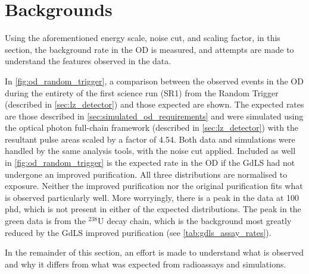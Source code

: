 \section{Backgrounds}
\label{sec:od_analysis_backgrounds}
\par
Using the aforementioned energy scale, noise cut, and scaling factor, in this section, the background rate in the OD is measured, and attempts are made to understand the features observed in the data.
\par
In \autoref{fig:od_random_trigger}, a comparison between the observed events in the OD during the entirety of the first science run (SR1) from the Random Trigger (described in \autoref{sec:lz_detector}) and those expected are shown.
The expected rates are those described in \autoref{sec:simulated_od_requirements} and were simulated using the optical photon full-chain framework (described in \autoref{sec:lz_detector}) with the resultant pulse areas scaled by a factor of 4.54.
Both data and simulations were handled by the same analysis tools, with the noise cut applied.
Included as well in \autoref{fig:od_random_trigger} is the expected rate in the OD if the GdLS had not undergone an improved purification.
All three distributions are normalised to exposure.
Neither the improved purification nor the original purification fits what is observed particularly well.
More worryingly, there is a peak in the data at 100 phd, which is not present in either of the expected distributions.
The peak in the green data is from the $^{238}$U decay chain, which is the background most greatly reduced by the GdLS improved purification (see \autoref{tab:gdls_assay_rates}).
\par
In the remainder of this section, an effort is made to understand what is observed and why it differs from what was expected from radioassays and simulations.




